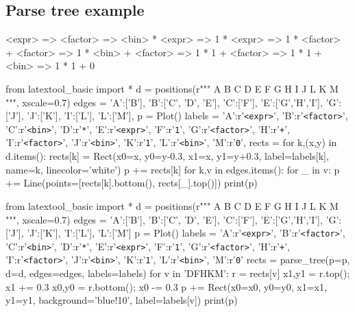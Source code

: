 \newpage
\subsection{Parse tree example}

\begin{console}
<expr> => <factor>
       => <bin> * <expr>
       => 1 * <expr>
       => 1 * <factor> + <factor>
       => 1 * <bin> + <factor>
       => 1 * 1 + <factor>
       => 1 * 1 + <bin>
       => 1 * 1 + 0
\end{console}

\begin{python}
from latextool_basic import *
d = positions(r"""
   A
   B
C  D  E
F   G H I
    J   L
    K   M
""", xscale=0.7)
edges = {'A':['B'],          'B':['C', 'D', 'E'], 'C':['F'],
         'E':['G','H','I'],  'G':['J'],           'J':['K'],
         'I':['L'],          'L':['M'],
        }
p = Plot()
labels = {'A':r'\texttt{<expr>}',   'B':r'\texttt{<factor>}',
          'C':r'\texttt{<bin>}',    'D':r'\texttt{*}',
          'E':r'\texttt{<expr>}',   'F':r'\texttt{1}',
          'G':r'\texttt{<factor>}', 'H':r'\texttt{+}',
          'I':r'\texttt{<factor>}', 'J':r'\texttt{<bin>}',
          'K':r'\texttt{1}',        'L':r'\texttt{<bin>}',
          'M':r'\texttt{0}',
        }
rects = {}
for k,(x,y) in d.items():
    rects[k] = Rect(x0=x, y0=y-0.3, x1=x, y1=y+0.3, label=labels[k],
                    name=k, linecolor='white')
    p += rects[k]
for k,v in edges.items():
    for _ in v:
        p += Line(points=[rects[k].bottom(), rects[_].top()])
print(p)
\end{python}






\begin{python}
from latextool_basic import *
d = positions(r"""
   A
   B
C  D  E
F   G H I
    J   L
    K   M
""", xscale=0.7)
edges = {'A':['B'],          'B':['C', 'D', 'E'], 'C':['F'],
         'E':['G','H','I'],  'G':['J'],           'J':['K'],
         'I':['L'],          'L':['M']}
p = Plot()
labels = {'A':r'\texttt{<expr>}',   'B':r'\texttt{<factor>}',
          'C':r'\texttt{<bin>}',    'D':r'\texttt{*}',
          'E':r'\texttt{<expr>}',   'F':r'\texttt{1}',
          'G':r'\texttt{<factor>}', 'H':r'\texttt{+}',
          'I':r'\texttt{<factor>}', 'J':r'\texttt{<bin>}',
          'K':r'\texttt{1}',        'L':r'\texttt{<bin>}',
          'M':r'\texttt{0}'}
rects = parse_tree(p=p, d=d, edges=edges, labels=labels)
for v in 'DFHKM':
    r = rects[v]
    x1,y1 = r.top(); x1 += 0.3
    x0,y0 = r.bottom(); x0 -= 0.3
    p += Rect(x0=x0, y0=y0, x1=x1, y1=y1, background='blue!10',
              label=labels[v])
print(p)
\end{python}
